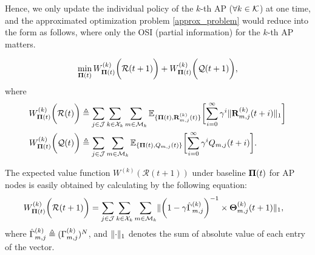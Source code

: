 Hence, we only update the individual policy of the $k$-th AP ($\forall k\in\mathcal{K}$) at one time, and the approximated optimization problem \ref{approx_problem} would reduce into the form as follows, where only the OSI (partial information) for the $k$-th AP matters.
\begin{problem}
    \begin{align}
        \min_{\boldsymbol{\Pi}(t)} W^{(k)}_{\boldsymbol{\Pi}(t)}\bigg(\mathcal{R}(t+1)\bigg) + W^{(k)}_{\boldsymbol{\Pi}(t)}\bigg(\mathcal{Q}(t+1)\bigg),
        \label{eqn_partial}
    \end{align}
    where 
    \begin{align}
        W^{(k)}_{\BaseLine(t)}\Paren{\mathcal{R}(t)}
            &\define \sum_{j\in\jSpace}\sum_{k\in\ccSet_{k}}\sum_{m\in\esSet_{k}}
            \mathbb{E}_{\{\BaseLine(t), \vec{R}^{(k)}_{m,j}(t)\}}\Bracket{
                \sum_{i=0}^{\infty} \gamma^{i} \Inorm{\vec{R}^{(k)}_{m,j}({t+i})}
            }
        \\
        W^{(k)}_{\BaseLine(t)}\Paren{\mathcal{Q}(t)}
            &\define \sum_{j\in\jSpace}\sum_{m\in\esSet_{k}}
            \mathbb{E}_{\{\BaseLine(t), Q_{m,j}(t)\}}\Bracket{
                \sum_{i=0}^{\infty} \gamma^{i} Q_{m,j}({t+i})
            }.
    \end{align}
\end{problem}
The expected value function $W^{(k)}(\mathcal{R}(t+1))$ under baseline $\boldsymbol{\Pi}(t)$ for AP nodes is easily obtained by calculating by the following equation:
\begin{align}
    &W^{(k)}_{\boldsymbol{\Pi}(t)}\bigg(\mathcal{R}(t+1)\bigg) = \sum_{j\in\mathcal{J}}\sum_{k\in\mathcal{X}_{k}}\sum_{m\in\mathcal{M}_{k}}
    \lVert
        \bigg(1 - \gamma \hat{\Gamma}^{(k)}_{m,j}\bigg)^{-1}
        \times \boldsymbol{\Theta}^{(k)}_{m,j}(t+1)
    \|_1,
    \label{w_ap}
\end{align}
where $\hat{\Gamma}^{(k)}_{m,j} \triangleq (\Gamma^{(k)}_{m,j})^{N}$, and $\lVert\cdot\|_1$ denotes the sum of absolute value of each entry of the vector.

